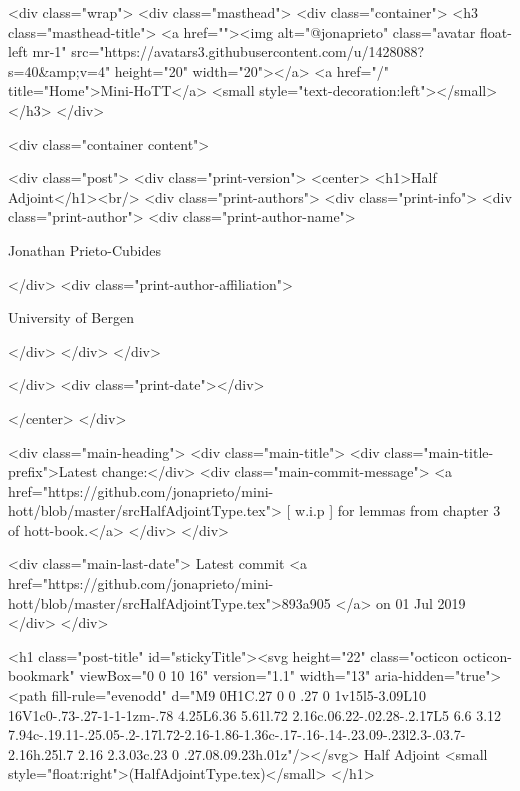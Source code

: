     <div class="wrap">
      <div class="masthead">
        <div class="container">
          <h3 class="masthead-title">
            <a href=""><img alt="@jonaprieto" class="avatar float-left mr-1" src="https://avatars3.githubusercontent.com/u/1428088?s=40&amp;v=4" height="20" width="20"></a>
            <a href="/" title="Home">Mini-HoTT</a>
            <small style="text-decoration:left"></small>
          </h3>
        </div>
      
      <div class="container content">
        







<div class="post">
  <div class="print-version">
    <center>
      <h1>Half Adjoint</h1><br/>
        <div class="print-authors">
          <div class="print-info">
            <div class="print-author">
              <div class="print-author-name">
                
                  Jonathan Prieto-Cubides
                
              </div>
              <div class="print-author-affiliation">
                
                  University of Bergen
                
                </div>
            </div>
          </div>
          
          
        </div>
        <div class="print-date"></div>
        
        
    </center>
  </div>

  
  <div class="main-heading">
    <div class="main-title">
      <div class="main-title-prefix">Latest change:</div>
      <div class="main-commit-message">
            <a href="https://github.com/jonaprieto/mini-hott/blob/master/srcHalfAdjointType.tex">
              [ w.i.p ] for lemmas from chapter 3 of hott-book.</a>
      </div>
    </div>

    <div class="main-last-date">
      Latest commit <a href="https://github.com/jonaprieto/mini-hott/blob/master/srcHalfAdjointType.tex">893a905 </a> on  01 Jul 2019
    </div>
  </div>
  

  <h1 class="post-title" id="stickyTitle"><svg height="22" class="octicon octicon-bookmark" viewBox="0 0 10 16" version="1.1" width="13" aria-hidden="true"><path fill-rule="evenodd" d="M9 0H1C.27 0 0 .27 0 1v15l5-3.09L10 16V1c0-.73-.27-1-1-1zm-.78 4.25L6.36 5.61l.72 2.16c.06.22-.02.28-.2.17L5 6.6 3.12 7.94c-.19.11-.25.05-.2-.17l.72-2.16-1.86-1.36c-.17-.16-.14-.23.09-.23l2.3-.03.7-2.16h.25l.7 2.16 2.3.03c.23 0 .27.08.09.23h.01z"/></svg> Half Adjoint <small style="float:right">(HalfAdjointType.tex)</small>
  </h1>


